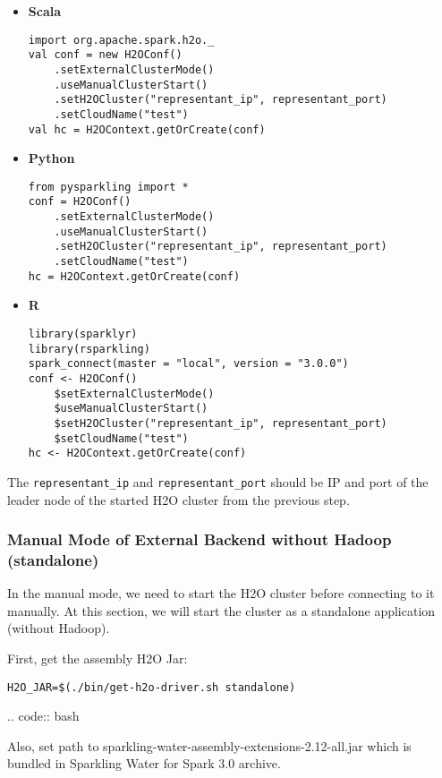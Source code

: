 \begin{itemize}
    \item \textbf{Scala} \begin{lstlisting}[style=Scala]
import org.apache.spark.h2o._
val conf = new H2OConf()
    .setExternalClusterMode()
    .useManualClusterStart()
    .setH2OCluster("representant_ip", representant_port)
    .setCloudName("test")
val hc = H2OContext.getOrCreate(conf)
    \end{lstlisting}
    \item \textbf{Python} \begin{lstlisting}[style=Python]
from pysparkling import *
conf = H2OConf()
    .setExternalClusterMode()
    .useManualClusterStart()
    .setH2OCluster("representant_ip", representant_port)
    .setCloudName("test")
hc = H2OContext.getOrCreate(conf)
    \end{lstlisting}
    \item \textbf{R} \begin{lstlisting}[style=R]
library(sparklyr)
library(rsparkling)
spark_connect(master = "local", version = "3.0.0")
conf <- H2OConf()
    $setExternalClusterMode()
    $useManualClusterStart()
    $setH2OCluster("representant_ip", representant_port)
    $setCloudName("test")
hc <- H2OContext.getOrCreate(conf)
    \end{lstlisting}
\end{itemize}


The \texttt{representant\_ip} and \texttt{representant\_port} should be IP and port of the leader node of the started
H2O cluster from the previous step.

\subsubsection{Manual Mode of External Backend without Hadoop (standalone)}

In the manual mode, we need to start the H2O cluster before connecting to it manually. At this section, we will start
the cluster as a standalone application (without Hadoop).

First, get the assembly H2O Jar:

\begin{lstlisting}[style=bash]
H2O_JAR=$(./bin/get-h2o-driver.sh standalone)
\end{lstlisting}

.. code:: bash


Also, set path to sparkling-water-assembly-extensions-2.12-all.jar which is bundled in Sparkling Water for Spark 3.0 archive.

